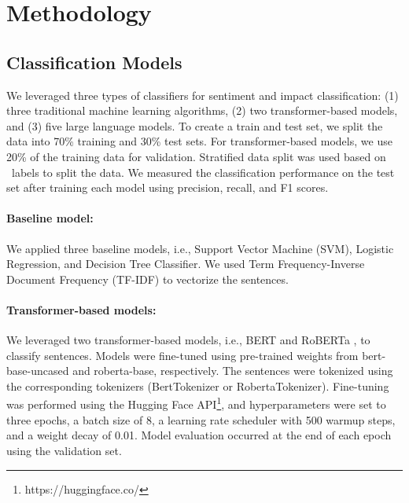 \section{Methodology}

\subsection{Classification Models} \label{section:classification_models}
We leveraged three types of classifiers for sentiment and impact classification: (1) three traditional machine learning algorithms, (2) two transformer-based models, and (3) five large language models. 
To create a train and test set, we split the data into 70\% training and 30\% test sets. For transformer-based models, we use 20\% of the training data for validation.
Stratified data split was used based on \impact\ labels to split the data.
We measured the classification performance on the test set after training each model using precision, recall, and F1 scores. 


\paragraph{Baseline model: }
We applied three baseline models, i.e., Support Vector Machine (SVM), Logistic Regression, and Decision Tree Classifier. 
We used Term Frequency-Inverse Document Frequency (TF-IDF) to vectorize the sentences. 

\paragraph{Transformer-based models: }
We leveraged two transformer-based models, i.e., BERT \cite{DBLP:journals/corr/abs-1810-04805} and RoBERTa \cite{DBLP:journals/corr/abs-1907-11692}, to classify sentences. Models were fine-tuned using pre-trained weights from bert-base-uncased and roberta-base, respectively. The sentences were tokenized using the corresponding tokenizers (BertTokenizer or RobertaTokenizer).
Fine-tuning was performed using the Hugging Face API\footnote{https://huggingface.co/}, and hyperparameters were set to three epochs, a batch size of 8, a learning rate scheduler with 500 warmup steps, and a weight decay of 0.01. Model evaluation occurred at the end of each epoch using the validation set.

